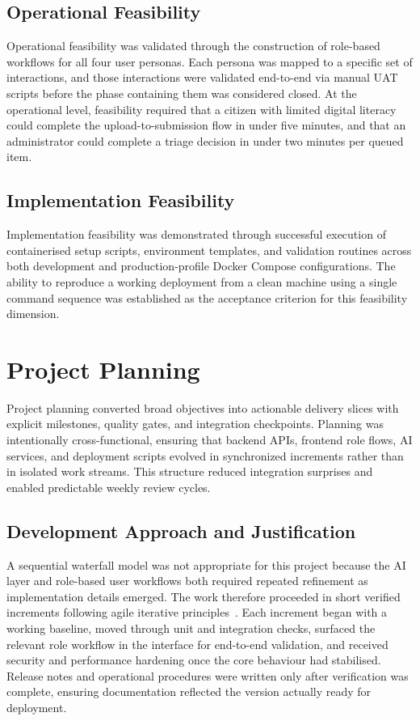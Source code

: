 \subsection{Operational Feasibility}

Operational feasibility was validated through the construction of role-based workflows for all four user personas. Each persona was mapped to a specific set of interactions, and those interactions were validated end-to-end via manual UAT scripts before the phase containing them was considered closed. At the operational level, feasibility required that a citizen with limited digital literacy could complete the upload-to-submission flow in under five minutes, and that an administrator could complete a triage decision in under two minutes per queued item.

\subsection{Implementation Feasibility}

Implementation feasibility was demonstrated through successful execution of containerised setup scripts, environment templates, and validation routines across both development and production-profile Docker Compose configurations. The ability to reproduce a working deployment from a clean machine using a single command sequence was established as the acceptance criterion for this feasibility dimension.



\section{Project Planning}

Project planning converted broad objectives into actionable delivery slices with explicit milestones, quality gates, and integration checkpoints. Planning was intentionally cross-functional, ensuring that backend APIs, frontend role flows, AI services, and deployment scripts evolved in synchronized increments rather than in isolated work streams. This structure reduced integration surprises and enabled predictable weekly review cycles.

\subsection{Development Approach and Justification}

A sequential waterfall model was not appropriate for this project because the AI layer and role-based user workflows both required repeated refinement as implementation details emerged. The work therefore proceeded in short verified increments following agile iterative principles~\cite{agile_manifesto}. Each increment began with a working baseline, moved through unit and integration checks, surfaced the relevant role workflow in the interface for end-to-end validation, and received security and performance hardening once the core behaviour had stabilised. Release notes and operational procedures were written only after verification was complete, ensuring documentation reflected the version actually ready for deployment.


